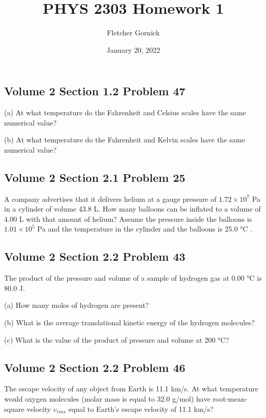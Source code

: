 \documentclass[11pt]{article}
\title{\vspace{-1.0cm}PHYS 2303 Homework 1}
\author{Fletcher Gornick}
\date{January 20, 2022}
\begin{document}
 \maketitle 

 \subsection*{Volume 2 Section 1.2 Problem 47}
 (a) At what temperature do the Fahrenheit and Celsius scales have the same 
 numerical value?

 (b) At what temperature do the Fahrenheit and Kelvin scales have 
 the same numerical value? \newpage

 \subsection*{Volume 2 Section 2.1 Problem 25}
 A company advertises that it delivers helium at a gauge pressure of 
 \(1.72 \times 10^7\) Pa in a cylinder of volume 43.8 L. How many balloons can be 
 inflated to a volume of 4.00 L with that amount of helium? Assume the pressure
 inside the balloons is \(1.01 \times 10^5\) Pa and the temperature in the cylinder 
 and the balloons is 25.0 °C . \newpage

 \subsection*{Volume 2 Section 2.2 Problem 43}
 The product of the pressure and volume of a sample of hydrogen gas at 0.00 °C is 
 80.0 J. 

 (a) How many moles of hydrogen are present? 

 (b) What is the average translational kinetic energy of the hydrogen molecules? 

 (c) What is the value of the product of pressure and volume at 200 °C?
 \newpage

 \subsection*{Volume 2 Section 2.2 Problem 46}
 The escape velocity of any object from Earth is 11.1 km/s. At what temperature 
 would oxygen molecules (molar mass is equal to 32.0 g/mol) have root-mean-square 
 velocity \(v_{rms}\) equal to Earth’s escape velocity of 11.1 km/s?
\end{document}
